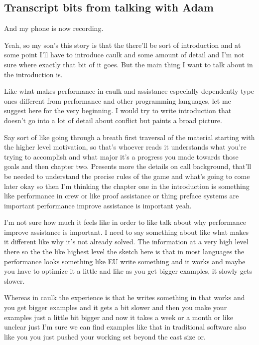 \begin{subappendices}

\section{Transcript bits from talking with Adam}
And my phone is now recording. 

Yeah, so my son's this story is that the there'll be sort of introduction and at some point I'll have to introduce caulk and some amount of detail and I'm not sure where exactly that bit of it goes. But the main thing I want to talk about in the introduction is. 

Like what makes performance in caulk and assistance especially dependently type ones different from performance and other programming languages, let me suggest here for the very beginning. I would try to write introduction that doesn't go into a lot of detail about conflict but paints a broad picture. 

Say sort of like going through a breath first traversal of the material starting with the higher level motivation, so that's whoever reads it understands what you're trying to accomplish and what major it's a progress you made towards those goals and then chapter two. Presents more the details on call background, that'll be needed to understand the precise rules of the game and what's going to come later okay so then I'm thinking the chapter one in the introduction is something like performance in crew or like proof assistance or thing preface systems are important performance improve assistance is important yeah. 

I'm not sure how much it feels like in order to like talk about why performance improve assistance is important. I need to say something about like what makes it different like why it's not already solved. The information at a very high level there so the the like highest level the sketch here is that in most languages the performance looks something like EU write something and it works and maybe you have to optimize it a little and like as you get bigger examples, it slowly gets slower. 

Whereas in caulk the experience is that he writes something in that works and you get bigger examples and it gets a bit slower and then you make your examples just a little bit bigger and now it takes a week or a month or like unclear just I'm sure we can find examples like that in traditional software also like you you just pushed your working set beyond the cast size or. 


\end{subappendices}
